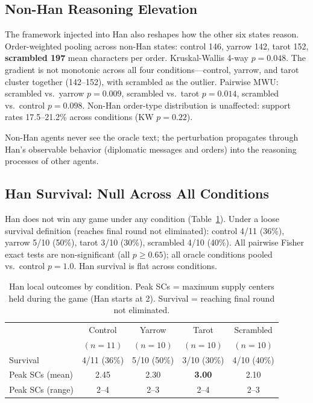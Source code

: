 \documentclass[11pt]{article}
\begin{document}
\subsection{Non-Han Reasoning Elevation}
\label{sec:nonhan}

The framework injected into Han also reshapes how the other six states reason. Order-weighted pooling across non-Han states: control 146, yarrow 142, tarot 152, \textbf{scrambled 197} mean characters per order. Kruskal-Wallis 4-way $p = 0.048$. The gradient is not monotonic across all four conditions---control, yarrow, and tarot cluster together (142--152), with scrambled as the outlier. Pairwise MWU: scrambled vs.\ yarrow $p = 0.009$, scrambled vs.\ tarot $p = 0.014$, scrambled vs.\ control $p = 0.098$. Non-Han order-type distribution is unaffected: support rates 17.5--21.2\% across conditions (KW $p = 0.22$).

Non-Han agents never see the oracle text; the perturbation propagates through Han's observable behavior (diplomatic messages and orders) into the reasoning processes of other agents.

\subsection{Han Survival: Null Across All Conditions}
\label{sec:survival}

Han does not win any game under any condition (Table~\ref{tab:local}). Under a loose survival definition (reaches final round not eliminated): control 4/11 (36\%), yarrow 5/10 (50\%), tarot 3/10 (30\%), scrambled 4/10 (40\%). All pairwise Fisher exact tests are non-significant (all $p \geq 0.65$); all oracle conditions pooled vs.\ control $p = 1.0$. Han survival is flat across conditions.

\begin{table}[t]
\centering
\caption{Han local outcomes by condition. Peak SCs = maximum supply centers held during the game (Han starts at 2). Survival = reaching final round not eliminated.}
\label{tab:local}
\begin{tabular}{lcccc}
\toprule
& Control & Yarrow & Tarot & Scrambled \\
& $(n\!=\!11)$ & $(n\!=\!10)$ & $(n\!=\!10)$ & $(n\!=\!10)$ \\
\midrule
Survival & 4/11 (36\%) & 5/10 (50\%) & 3/10 (30\%) & 4/10 (40\%) \\
Peak SCs (mean) & 2.45 & 2.30 & \textbf{3.00} & 2.10 \\
Peak SCs (range) & 2--4 & 2--3 & 2--4 & 2--3 \\
\bottomrule
\end{tabular}
\end{table}
\end{document}
